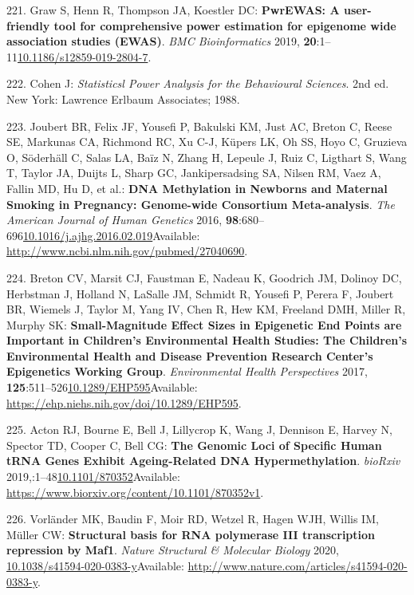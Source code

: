 \documentclass[
]{book}
\begin{document}
\leavevmode\hypertarget{ref-Graw2019}{}%
221. Graw S, Henn R, Thompson JA, Koestler DC: \textbf{PwrEWAS: A user-friendly tool for comprehensive power estimation for epigenome wide association studies (EWAS)}. \emph{BMC Bioinformatics} 2019, \textbf{20}:1--11\href{https://doi.org/10.1186/s12859-019-2804-7}{10.1186/s12859-019-2804-7}.

\leavevmode\hypertarget{ref-Cohen1988}{}%
222. Cohen J: \emph{Statisticsl Power Analysis for the Behavioural Sciences}. 2nd ed. New York: Lawrence Erlbaum Associates; 1988.

\leavevmode\hypertarget{ref-Joubert2016}{}%
223. Joubert BR, Felix JF, Yousefi P, Bakulski KM, Just AC, Breton C, Reese SE, Markunas CA, Richmond RC, Xu C-J, Küpers LK, Oh SS, Hoyo C, Gruzieva O, Söderhäll C, Salas LA, Baïz N, Zhang H, Lepeule J, Ruiz C, Ligthart S, Wang T, Taylor JA, Duijts L, Sharp GC, Jankipersadsing SA, Nilsen RM, Vaez A, Fallin MD, Hu D, et al.: \textbf{DNA Methylation in Newborns and Maternal Smoking in Pregnancy: Genome-wide Consortium Meta-analysis}. \emph{The American Journal of Human Genetics} 2016, \textbf{98}:680--696\href{https://doi.org/10.1016/j.ajhg.2016.02.019}{10.1016/j.ajhg.2016.02.019}Available: \url{http://www.ncbi.nlm.nih.gov/pubmed/27040690}.

\leavevmode\hypertarget{ref-Breton2017}{}%
224. Breton CV, Marsit CJ, Faustman E, Nadeau K, Goodrich JM, Dolinoy DC, Herbstman J, Holland N, LaSalle JM, Schmidt R, Yousefi P, Perera F, Joubert BR, Wiemels J, Taylor M, Yang IV, Chen R, Hew KM, Freeland DMH, Miller R, Murphy SK: \textbf{Small-Magnitude Effect Sizes in Epigenetic End Points are Important in Children's Environmental Health Studies: The Children's Environmental Health and Disease Prevention Research Center's Epigenetics Working Group}. \emph{Environmental Health Perspectives} 2017, \textbf{125}:511--526\href{https://doi.org/10.1289/EHP595}{10.1289/EHP595}Available: \url{https://ehp.niehs.nih.gov/doi/10.1289/EHP595}.

\leavevmode\hypertarget{ref-Acton2020}{}%
225. Acton RJ, Bourne E, Bell J, Lillycrop K, Wang J, Dennison E, Harvey N, Spector TD, Cooper C, Bell CG: \textbf{The Genomic Loci of Specific Human tRNA Genes Exhibit Ageing-Related DNA Hypermethylation}. \emph{bioRxiv} 2019,:1--48\href{https://doi.org/10.1101/870352}{10.1101/870352}Available: \url{https://www.biorxiv.org/content/10.1101/870352v1}.

\leavevmode\hypertarget{ref-Vorlander2020}{}%
226. Vorländer MK, Baudin F, Moir RD, Wetzel R, Hagen WJH, Willis IM, Müller CW: \textbf{Structural basis for RNA polymerase III transcription repression by Maf1}. \emph{Nature Structural \& Molecular Biology} 2020, \href{https://doi.org/10.1038/s41594-020-0383-y}{10.1038/s41594-020-0383-y}Available: \url{http://www.nature.com/articles/s41594-020-0383-y}.
\end{document}
